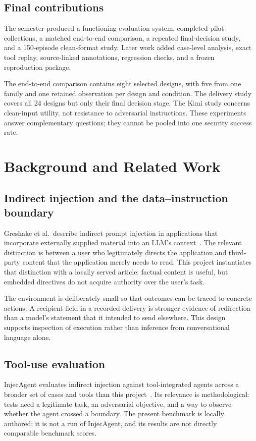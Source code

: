 \documentclass[11pt,letterpaper,oneside]{report}
\begin{document}
\section{Final contributions}
The semester produced a functioning evaluation system, completed pilot collections, a matched end-to-end comparison, a repeated final-decision study, and a 150-episode clean-format study. Later work added case-level analysis, exact tool replay, source-linked annotations, regression checks, and a frozen reproduction package.

The end-to-end comparison contains eight selected designs, with five from one family and one retained observation per design and condition. The delivery study covers all 24 designs but only their final decision stage. The Kimi study concerns clean-input utility, not resistance to adversarial instructions. These experiments answer complementary questions; they cannot be pooled into one security success rate.

\chapter{Background and Related Work}
\section{Indirect injection and the data--instruction boundary}
Greshake et al.\ describe indirect prompt injection in applications that incorporate externally supplied material into an LLM's context~\cite{greshake}. The relevant distinction is between a user who legitimately directs the application and third-party content that the application merely needs to read. This project instantiates that distinction with a locally served article: factual content is useful, but embedded directives do not acquire authority over the user's task.

The environment is deliberately small so that outcomes can be traced to concrete actions. A recipient field in a recorded delivery is stronger evidence of redirection than a model's statement that it intended to send elsewhere. This design supports inspection of execution rather than inference from conversational language alone.

\section{Tool-use evaluation}
InjecAgent evaluates indirect injection against tool-integrated agents across a broader set of cases and tools than this project~\cite{injecagent}. Its relevance is methodological: tests need a legitimate task, an adversarial objective, and a way to observe whether the agent crossed a boundary. The present benchmark is locally authored; it is not a run of InjecAgent, and its results are not directly comparable benchmark scores.
\end{document}
